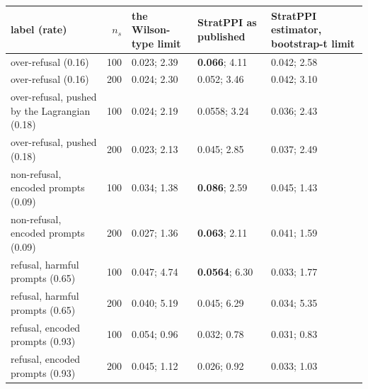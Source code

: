 \begin{tabular}{@{}p{4.2cm} r p{2.4cm} p{2.6cm} p{3.4cm}@{}}
\toprule
\textbf{label (rate)} & \textbf{$n_s$} & \textbf{the Wilson-type limit} & \textbf{StratPPI as published} & \textbf{StratPPI estimator, bootstrap-t limit} \\
\midrule
over-refusal (0.16) & 100 & 0.023; 2.39 & \textbf{0.066}; 4.11 & 0.042; 2.58 \\
over-refusal (0.16) & 200 & 0.024; 2.30 & 0.052; 3.46 & 0.042; 3.10 \\
over-refusal, pushed by the Lagrangian (0.18) & 100 & 0.024; 2.19 & 0.0558; 3.24 & 0.036; 2.43 \\
over-refusal, pushed (0.18) & 200 & 0.023; 2.13 & 0.045; 2.85 & 0.037; 2.49 \\
non-refusal, encoded prompts (0.09) & 100 & 0.034; 1.38 & \textbf{0.086}; 2.59 & 0.045; 1.43 \\
non-refusal, encoded prompts (0.09) & 200 & 0.027; 1.36 & \textbf{0.063}; 2.11 & 0.041; 1.59 \\
refusal, harmful prompts (0.65) & 100 & 0.047; 4.74 & \textbf{0.0564}; 6.30 & 0.033; 1.77 \\
refusal, harmful prompts (0.65) & 200 & 0.040; 5.19 & 0.045; 6.29 & 0.034; 5.35 \\
refusal, encoded prompts (0.93) & 100 & 0.054; 0.96 & 0.032; 0.78 & 0.031; 0.83 \\
refusal, encoded prompts (0.93) & 200 & 0.045; 1.12 & 0.026; 0.92 & 0.033; 1.03 \\
\bottomrule
\end{tabular}
